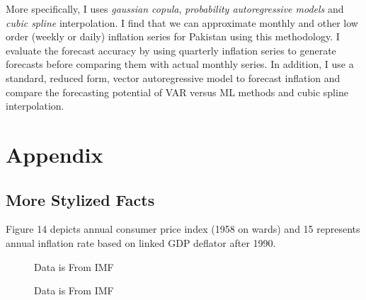 \documentclass[12pt]{article}
\newcommand{\1}{\mathbbm 1}
\begin{document}
		More specifically, I uses \textit{gaussian copula}, \textit{probability autoregressive models} and \textit{cubic spline} interpolation. I find that we can approximate monthly and other low order (weekly or daily) inflation series for Pakistan using this methodology. I evaluate the forecast accuracy by using quarterly inflation series to generate forecasts before comparing them with actual monthly series. In addition, I use a standard, reduced form, vector autoregressive model to forecast inflation and compare the forecasting potential of VAR versus ML methods and cubic spline interpolation.
		
		
		
		
		
		
		
		
		
		
		
		
		
		\newpage
		
		
		
		
		
		
		
		
		
		
		
		
		\section{Appendix}
		
		\subsection{More Stylized Facts}
		
		Figure 14 depicts annual consumer price index (1958 on wards) and 15 represents annual inflation rate based on linked GDP deflator after 1990.
		
	
	\begin{figure}[H]
		\centering
		\scalebox{0.6}{}
		\hfill
		\caption{Data is From IMF}
	\end{figure}

\begin{figure}[H]
	\centering
	\scalebox{0.6}{}
	\hfill
	\caption{Data is From IMF}
\end{figure}
	
\end{document}
